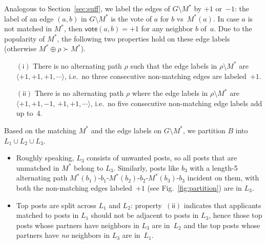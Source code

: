 \documentclass[11pt]{llncs}
\newcommand{\vote}{\mathsf{vote}}
\begin{document}
Analogous to Section~\ref{sec:suff}, we label the edges of $G \setminus M^*$ by $+1$ or~$-1$: the label of an edge $(a,b)$ in 
$G \setminus M^*$ is the vote of $a$ for $b$ vs~$M^*(a)$. In case $a$ is not matched in $M^*$, 
then $\vote(a,b) = +1$ for any neighbor $b$ of~$a$. Due to the popularity of $M^*$, 
the following two properties hold on these edge labels (otherwise $M^* \oplus \rho \succ M^*$).

\begin{enumerate} 
\item[$\mathsf{(i)}$] There is no alternating path $\rho$ such that the edge labels in 
$\rho \setminus M^*$ are $\langle +1, +1, +1, \cdots \rangle$, i.e.\
no three consecutive non-matching edges are labeled~$+1$. 
\item[$\mathsf{(ii)}$]  There is no alternating path $\rho$ where the edge labels in 
$\rho \setminus M^*$ are $\langle +1, +1, -1$, $+1, +1, \cdots \rangle$, i.e.\
no five consecutive non-matching edge labels add up to~4.
\end{enumerate}

Based on the matching $M^*$ and the edge labels on $G \setminus M^*$, we partition $B$ into 
$L_1 \cup L_2 \cup L_3$. 
\begin{itemize}
\item Roughly speaking, $L_3$ consists of unwanted posts, so
all posts that are unmatched in $M^*$ belong to $L_3$. Similarly, posts like $b_3$ with a
length-5 alternating path $M^*(b_1)$-$b_1$-$M^*(b_2)$-$b_2$-$M^*(b_3)$-$b_3$ incident on them,
with both the non-matching edges labeled~$+1$ (see Fig.~\ref{fig:partition}) are in $L_3$.
\item Top posts are split across $L_1$ and $L_2$: property~$\mathsf{(ii)}$ indicates
that applicants matched to posts in $L_1$ should not be adjacent to posts in $L_3$,
hence those top posts whose partners have neighbors in $L_3$ are in~$L_2$ and
the top posts whose partners have {\em no} neighbors in $L_3$ are in~$L_1$.
\end{itemize}
\end{document}
